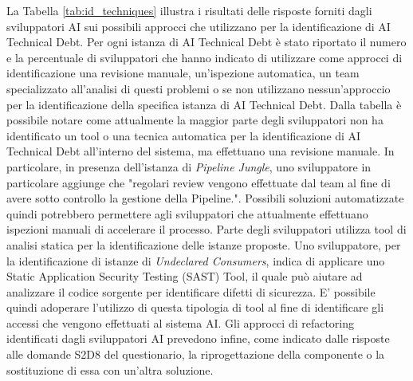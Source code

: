 La Tabella \ref{tab:id_techniques} illustra i risultati delle risposte forniti dagli sviluppatori AI sui possibili approcci che utilizzano per la identificazione di AI Technical Debt.
Per ogni istanza di AI Technical Debt è stato riportato il numero e la percentuale di sviluppatori che hanno indicato di utilizzare come approcci di identificazione una revisione manuale, un'ispezione automatica, un team specializzato all'analisi di questi problemi o se non utilizzano nessun'approccio per la identificazione della specifica istanza di AI Technical Debt.
Dalla tabella è possibile notare come attualmente la maggior parte degli sviluppatori non ha identificato un tool o una tecnica automatica per la identificazione di AI Technical Debt all'interno del sistema, ma effettuano una revisione manuale.
In particolare, in presenza dell'istanza di \textit{Pipeline Jungle}, uno sviluppatore in particolare aggiunge che "regolari review vengono effettuate dal team al fine di avere sotto controllo la gestione della Pipeline.". 
Possibili soluzioni automatizzate quindi potrebbero permettere agli sviluppatori che attualmente effettuano ispezioni manuali di accelerare il processo.
Parte degli sviluppatori utilizza tool di analisi statica per la identificazione delle istanze proposte.
Uno sviluppatore, per la identificazione di istanze di \textit{Undeclared Consumers}, indica di applicare uno Static Application Security Testing (SAST) Tool, il quale può aiutare ad analizzare il codice sorgente per identificare difetti di sicurezza. 
E' possibile quindi adoperare l'utilizzo di questa tipologia di tool al fine di identificare gli accessi che vengono effettuati al sistema AI.
Gli approcci di refactoring identificati dagli sviluppatori AI prevedono infine, come indicato dalle risposte alle domande S2D8 del questionario, la riprogettazione della componente o la sostituzione di essa con un'altra soluzione.
